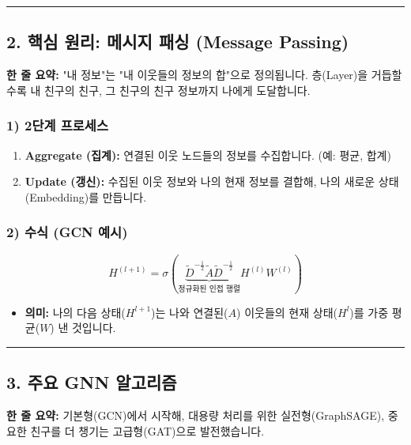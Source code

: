 \documentclass[11pt,a4paper]{book}
\theoremstyle{definition}
\begin{document}
\vspace{0.5cm}\hrule\vspace{0.5cm}

\subsection{2. 핵심 원리: 메시지 패싱 (Message Passing)}


\begin{conceptbox}[title={개념 2: 소문 퍼뜨리기 (Gossip)}]
\textbf{한 줄 요약:} "내 정보"는 "내 이웃들의 정보의 합"으로 정의됩니다. 층(Layer)을 거듭할수록 내 친구의 친구, 그 친구의 친구 정보까지 나에게 도달합니다.
\end{conceptbox}

\subsubsection*{1) 2단계 프로세스}
\begin{enumerate}
    \item \textbf{Aggregate (집계):} 연결된 이웃 노드들의 정보를 수집합니다. (예: 평균, 합계)
    \item \textbf{Update (갱신):} 수집된 이웃 정보와 나의 현재 정보를 결합해, 나의 새로운 상태(Embedding)를 만듭니다.
\end{enumerate}

\subsubsection*{2) 수식 (GCN 예시)}
$$ H^{(l+1)} = \sigma( \underbrace{\tilde{D}^{-\frac{1}{2}} \tilde{A} \tilde{D}^{-\frac{1}{2}}}_{\text{정규화된 인접 행렬}} H^{(l)} W^{(l)} ) $$
\begin{itemize}
    \item \textbf{의미:} 나의 다음 상태($H^{l+1}$)는 나와 연결된($A$) 이웃들의 현재 상태($H^l$)를 가중 평균($W$) 낸 것입니다.
\end{itemize}

\vspace{0.5cm}\hrule\vspace{0.5cm}

\subsection{3. 주요 GNN 알고리즘}

\begin{conceptbox}[title={개념 3: GNN의 진화}]
\textbf{한 줄 요약:} 기본형(GCN)에서 시작해, 대용량 처리를 위한 실전형(GraphSAGE), 중요한 친구를 더 챙기는 고급형(GAT)으로 발전했습니다.
\end{conceptbox}
\end{document}

